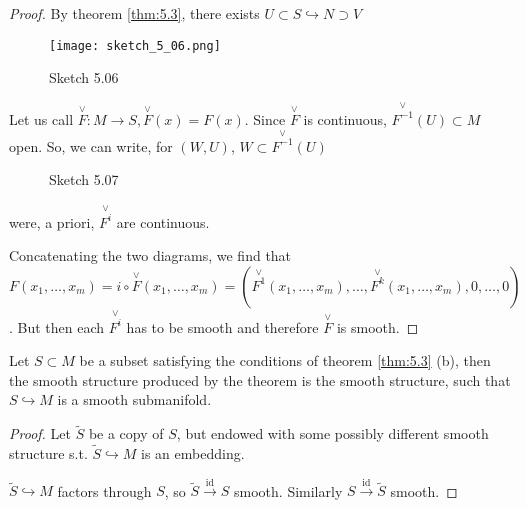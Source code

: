 \begin{proof} %
    By theorem \ref{thm:5.3}, there exists \(U\subset S\hookrightarrow N\supset V\)
    \begin{figure}[H]\label{fig:5.06}
        \centering
        \texttt{[image: sketch\_5\_06.png]}
        \caption{Sketch 5.06}
    \end{figure}
Let us call \(\stackrel{\vee}{F}:M\to S,\stackrel{\vee}{F}(x)=F(x)\). Since \(\stackrel{\vee}{F}\) 
is continuous, \(\stackrel{\vee}{F^{-1}}(U)\subset M\) open. So, we can write, for \((W,U)\), \(W\subset \stackrel{\vee}{F^{-1}}(U)\)
\begin{figure}[H]\label{fig:5.07}
    \centering
    \caption{Sketch 5.07}
\end{figure}
were, a priori, \(\stackrel{\vee}{F^{i}}\) are continuous.

Concatenating the two diagrams, we find that \(F(x_1,\dots,x_m)=i\circ \stackrel{\vee}{F}(x_1,\dots,x_m)=(\stackrel{\vee}{F^1}(x_1,\dots,x_m),\dots,\stackrel{\vee}{F^k}(x_1,\dots,x_m),0,\dots,0)\).
But then each \(\stackrel{\vee}{F^i}\)  has to be smooth and therefore \(\stackrel{\vee}{F}\) is smooth.
\end{proof}

\begin{lemma}\label{lem:5.5}
    Let \(S\subset M\) be a subset satisfying the conditions of theorem \ref{thm:5.3} (b), then 
    the smooth structure produced by the theorem is the  smooth structure, such that \(S \hookrightarrow M\) 
    is a smooth submanifold.
\end{lemma}

\begin{proof}%
    Let \(\tilde{S}\) be a copy of \(S\), but endowed with some possibly different smooth structure s.t. \(\tilde{S}\hookrightarrow M\) 
    is an embedding.
    
    \(\tilde{S}\hookrightarrow M\) factors through \(S\), so \(\tilde{S}\stackrel{\text{id}}{\to} S\) smooth. Similarly \(S\stackrel{\text{id}}{\to} \tilde{S}\) smooth.
\end{proof}


